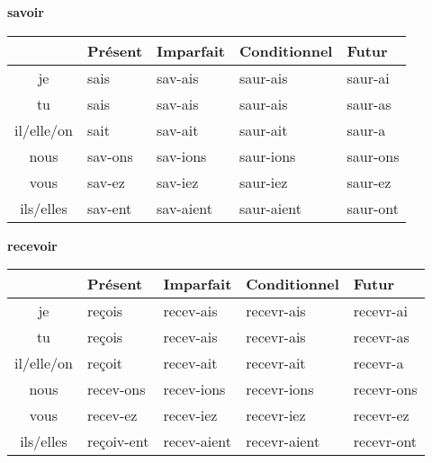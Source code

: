\renewcommand{\stemPresent}{sav}
\renewcommand{\stemFutur}{saur}
\begin{center}
\textbf{savoir}
\vskip 0.1cm
\begin{tabular}{|c||L{3cm}|L{3cm}|L{3cm}|L{3cm}|}
\hline
& Pr\'esent & Imparfait & Conditionnel & Futur \\
\hline\hline
je           &	{\color{red}sai}s 	&	\stemPresent-ais	&	\stemFutur-ais	 &	\stemFutur-ai	\\
tu           &	{\color{red}sai}s	&	\stemPresent-ais	&	\stemFutur-ais	&	\stemFutur-as	\\
il/elle/on &	{\color{red}sai}t		&	\stemPresent-ait	&	\stemFutur-ait	&	\stemFutur-a	\\
nous      &	\stemPresent-ons	&	\stemPresent-ions	&	\stemFutur-ions	&	\stemFutur-ons	\\
vous      &	\stemPresent-ez	&	\stemPresent-iez	&	\stemFutur-iez		&	\stemFutur-ez	\\
ils/elles  &	{\color{red}sav}-ent	&	\stemPresent-aient	&	\stemFutur-aient	&	\stemFutur-ont	\\
\hline
\end{tabular}
\end{center}


\clearpage

\renewcommand{\stemPresent}{recev}
\renewcommand{\stemFutur}{recevr}
\begin{center}
\textbf{recevoir}
\vskip 0.1cm
\begin{tabular}{|c||L{3cm}|L{3cm}|L{3cm}|L{3cm}|}
\hline
& Pr\'esent & Imparfait & Conditionnel & Futur \\
\hline\hline
je           &	{\color{red}re\c{c}oi}s 	&	\stemPresent-ais	&	\stemFutur-ais	 &	\stemFutur-ai	\\
tu           &	{\color{red}re\c{c}oi}s		&	\stemPresent-ais	&	\stemFutur-ais	&	\stemFutur-as	\\
il/elle/on &	{\color{red}re\c{c}oi}t		&	\stemPresent-ait	&	\stemFutur-ait	&	\stemFutur-a	\\
nous      &	\stemPresent-ons	&	\stemPresent-ions	&	\stemFutur-ions	&	\stemFutur-ons	\\
vous      &	\stemPresent-ez	&	\stemPresent-iez	&	\stemFutur-iez		&	\stemFutur-ez	\\
ils/elles  &	{\color{red}re\c{c}oiv}-ent	&	\stemPresent-aient	&	\stemFutur-aient	&	\stemFutur-ont	\\
\hline
\end{tabular}
\end{center}

